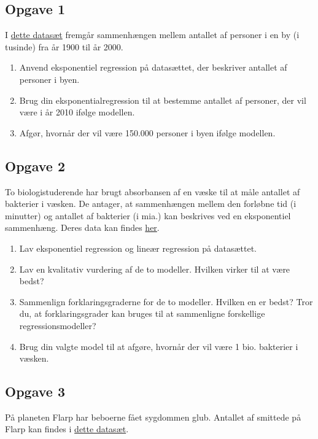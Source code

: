 \subsection*{Opgave 1}

I \href{https://github.com/ChristianJLex/TeachingNotes/raw/master/2022-2023/Data%20og%20lign/Befolkningsdata.xlsx}{\color{blue!60} dette datasæt} fremgår sammenhængen mellem antallet af personer i en by (i tusinde) fra år 1900 til år 2000.

\begin{enumerate}[label=\roman*)]
	\item Anvend eksponentiel regression på datasættet, der beskriver antallet af personer i byen.
	\item Brug din eksponentialregression til at bestemme antallet af personer, der vil være i år 2010 ifølge modellen.
	\item Afgør, hvornår der vil være 150.000 personer i byen ifølge modellen. 
\end{enumerate}


\subsection*{Opgave 2}
To biologistuderende har brugt absorbansen af en væske til at måle antallet af bakterier i væsken. De antager, at sammenhængen mellem den forløbne tid (i minutter) og antallet af bakterier (i mia.) kan beskrives ved en eksponentiel sammenhæng. Deres data kan findes \href{https://github.com/ChristianJLex/TeachingNotes/raw/master/2022-2023/Data%20og%20lign/Bakteriedata.xlsx}{\color{blue!60} her}.

\begin{enumerate}[label=\roman*)]
	\item Lav eksponentiel regression og lineær regression på datasættet.
	\item Lav en kvalitativ vurdering af de to modeller. Hvilken virker til at være bedst?
	\item Sammenlign forklaringsgraderne for de to modeller. Hvilken en er bedst? Tror du, at forklaringsgrader kan bruges til at sammenligne forskellige regressionsmodeller?
	\item Brug din valgte model til at afgøre, hvornår der vil være 1 bio. bakterier i væsken. 
\end{enumerate}


\subsection*{Opgave 3}
På planeten Flarp har beboerne fået sygdommen glub. Antallet af smittede på Flarp kan findes i \href{https://github.com/ChristianJLex/TeachingNotes/raw/master/2023-2024/Data%20og%20lign/smittede.xlsx}{\color{blue!60} dette datasæt}.

